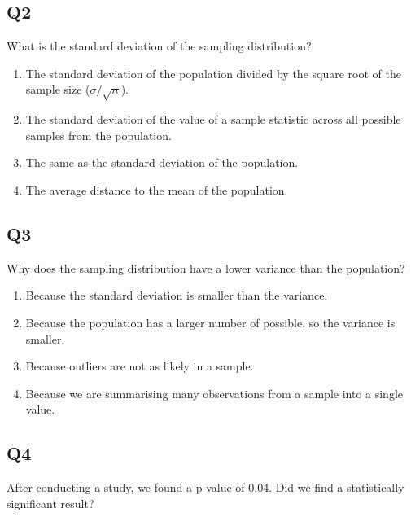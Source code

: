\documentclass[
  letterpaper,
  DIV=11,
  numbers=noendperiod]{scrreprt}
\providecommand{\tightlist}{%
  \setlength{\itemsep}{0pt}\setlength{\parskip}{0pt}}\usepackage{longtable,booktabs,array}
\def\pspace{}
\begin{document}
\hypertarget{q2-2}{%
\subsection{Q2}\label{q2-2}}

What is the standard deviation of the sampling distribution?

\pspace

\begin{enumerate}
\def\labelenumi{\arabic{enumi}.}
\tightlist
\item
  The standard deviation of the population divided by the square root of
  the sample size (\(\sigma/\sqrt{n}\)).
\item
  The standard deviation of the value of a sample statistic across all
  possible samples from the population.
\item
  The same as the standard deviation of the population.
\item
  The average distance to the mean of the population.
\end{enumerate}

\hypertarget{q3-2}{%
\subsection{Q3}\label{q3-2}}

Why does the sampling distribution have a lower variance than the
population?

\pspace

\begin{enumerate}
\def\labelenumi{\arabic{enumi}.}
\tightlist
\item
  Because the standard deviation is smaller than the variance.
\item
  Because the population has a larger number of possible, so the
  variance is smaller.
\item
  Because outliers are not as likely in a sample.
\item
  Because we are summarising many observations from a sample into a
  single value.
\end{enumerate}

\hypertarget{q4-2}{%
\subsection{Q4}\label{q4-2}}

After conducting a study, we found a p-value of 0.04. Did we find a
statistically significant result?
\end{document}
